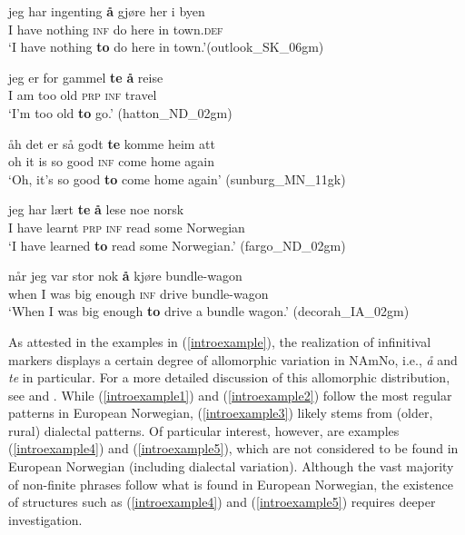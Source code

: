 \documentclass[output=paper,colorlinks,citecolor=brown]{langscibook}
\begin{document}
\begin{exe}

\item \label{introexample}

\begin{xlist}

\item \gll jeg har ingenting \textbf{å} gjøre her i byen \\
    I have nothing \textsc{inf} do here in town.\textsc{def}\\
    \glt `I have nothing \textbf{to} do here in town.'\hfill (outlook\_SK\_06gm)
    \label{introexample1} 

\item \gll jeg er for gammel \textbf{te} \textbf{å} reise  \\
    I am too old \textsc{prp} \textsc{inf} travel\\
    \glt `I'm too old \textbf{to} go.' \hfill(hatton\_ND\_02gm)
    \label{introexample2}

\item \gll åh det er så godt \textbf{te} komme heim att  \\
    oh it is so good \textsc{inf} come home again \\
    \glt `Oh, it's so good \textbf{to} come home again' \hfill(sunburg\_MN\_11gk)
    \label{introexample3}

\item \gll jeg har lært \textbf{te} \textbf{å} lese noe norsk  \\
    I have learnt \textsc{prp} \textsc{inf} read some Norwegian \\
    \glt `I have learned \textbf{to} read some Norwegian.' \hfill(fargo\_ND\_02gm)
    \label{introexample4}

\item \gll når jeg var stor nok \textbf{å} kjøre bundle-wagon  \\
    when I was big enough \textsc{inf} drive bundle-wagon \\
    \glt `When I was big enough \textbf{to} drive a bundle wagon.' \hfill(decorah\_IA\_02gm)
    \label{introexample5}

\end{xlist}

\end{exe}

As attested in the examples in (\ref{introexample}), the realization of infinitival markers displays a certain degree of allomorphic variation in NAmNo, i.e., \textit{\aa} and \textit{te} in particular. For a more detailed discussion of this allomorphic distribution, see \citet{Softelandetal2021} and \citet[Section 2.2]{putsoft}. While (\ref{introexample1}) and (\ref{introexample2}) follow the most regular patterns in European Norwegian, (\ref{introexample3}) likely stems from (older, rural) dialectal patterns. Of particular interest, however, are examples (\ref{introexample4}) and (\ref{introexample5}), which are not considered to be found in European Norwegian (including dialectal variation). Although the vast majority of non-finite phrases follow what is found in European Norwegian, the existence of structures such as (\ref{introexample4}) and (\ref{introexample5}) requires deeper investigation. 
\end{document}
